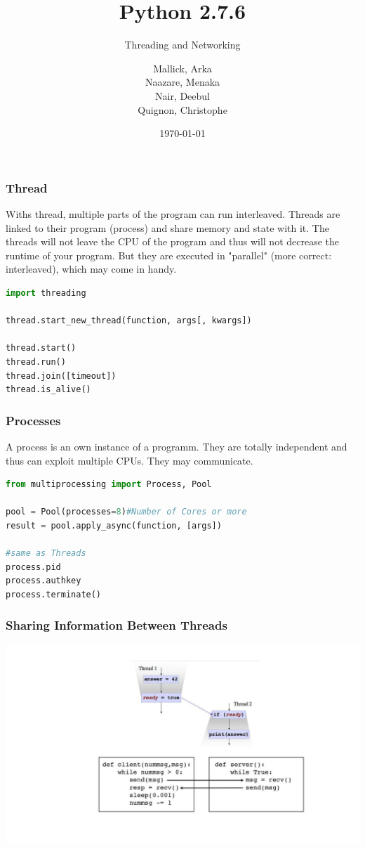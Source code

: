 \documentclass{beamer}
\begin{document}
\title{Python 2.7.6}
\subtitle{Threading and Networking}
\author{
  Mallick, Arka\\
  Naazare, Menaka \\
  Nair, Deebul\\
  Quignon, Christophe \\
} 
\date{\today}

\begin{frame}
\titlepage
\end{frame}

\begin{frame}[fragile]
\frametitle{Thread}
Withs thread, multiple parts of the program can run interleaved. Threads are linked to their program (process) and share memory and state with it.
The threads will not leave the CPU of the program and thus will not decrease the runtime of your program. But they are executed in "parallel" (more correct: interleaved), which may come in handy.


\begin{lstlisting}[language=Python]
import threading

thread.start_new_thread(function, args[, kwargs])

thread.start()
thread.run()
thread.join([timeout])
thread.is_alive()
\end{lstlisting}
\end{frame}

\begin{frame}[fragile]
\frametitle{Processes}
A process is an own instance of a programm. They are totally independent and thus can exploit multiple CPUs. They may communicate. 

\begin{lstlisting}[language=Python]
from multiprocessing import Process, Pool

pool = Pool(processes=8)#Number of Cores or more
result = pool.apply_async(function, [args])

#same as Threads
process.pid
process.authkey
process.terminate()
\end{lstlisting}
\end{frame}


\begin{frame}[fragile]
\frametitle{Sharing Information Between Threads}
\includegraphics[scale=0.5]{datashare.jpg}
\end{frame}
\end{document}
